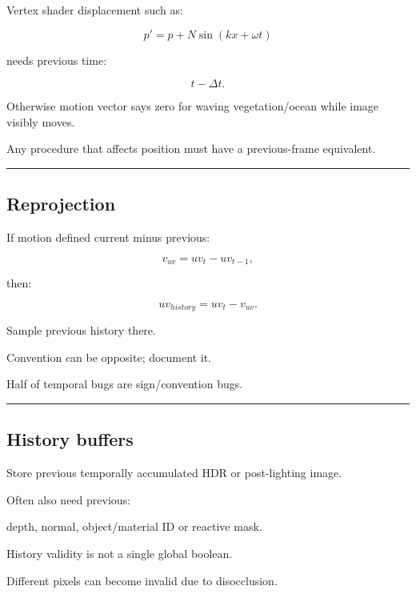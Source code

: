 Vertex shader displacement such as:

\[
p'=p+
N\sin(
kx+\omega t
)
\]

needs previous time:

\[
t-\Delta t.
\]

Otherwise motion vector says zero for waving vegetation/ocean while image visibly moves.

Any procedure that affects position must have a previous-frame equivalent.

\begin{center}\rule{0.5\linewidth}{0.5pt}\end{center}

\subsection{Reprojection}\label{04-visual-computing-ii-ch040-reprojection}

\hypertarget{04-visual-computing-ii-ch040-reprojection}{}

If motion defined current minus previous:

\[
v_{uv}
=
uv_t-uv_{t-1},
\]

then:

\[
\boxed{
uv_{history}
=
uv_t-v_{uv}.
}
\]

Sample previous history there.

Convention can be opposite; document it.

Half of temporal bugs are sign/convention bugs.

\begin{center}\rule{0.5\linewidth}{0.5pt}\end{center}

\subsection{History buffers}\label{04-visual-computing-ii-ch040-history-buffers}

\hypertarget{04-visual-computing-ii-ch040-history-buffers}{}

Store previous temporally accumulated HDR or post-lighting image.

Often also need previous:

depth, normal, object/material ID or reactive mask.

History validity is not a single global boolean.

Different pixels can become invalid due to disocclusion.


